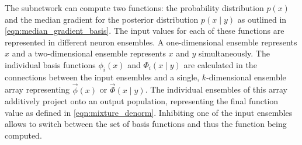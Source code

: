 \documentclass[a4paper,11pt]{article}
\begin{document}
The subnetwork can compute two functions: the probability distribution $p(x)$ and the median gradient for the posterior distribution $p(x \mid y)$ as outlined in \cref{eqn:median_gradient_basis}. The input values for each of these functions are represented in different neuron ensembles. A one-dimensional ensemble represents $x$ and a two-dimensional ensemble represents $x$ and $y$ simultaneously. The individual basis functions $\phi_i(x)$ and $\Phi_i(x \mid y)$ are calculated in the connections between the input ensembles and a single, $k$-dimensional ensemble array representing $\vec \phi(x)$ or $\vec \Phi(x \mid y)$. The individual ensembles of this array additively project onto an output population, representing the final function value as defined in \cref{eqn:mixture_denorm}. Inhibiting one of the input ensembles allows to switch between the set of basis functions and thus the function being computed.
\end{document}
